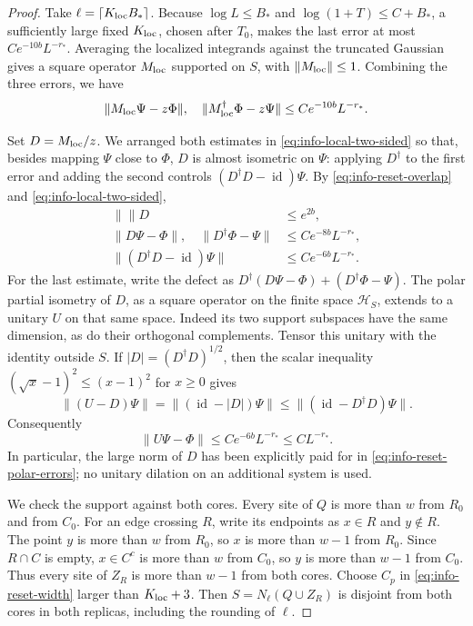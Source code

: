 \documentclass[11pt]{article}
\numberwithin{equation}{section}
\theoremstyle{definition}
\theoremstyle{remark}
\begin{document}
\begin{proof}
Take $\ell=\lceil K_{\rm loc}B_*\rceil$.  Because
$\log L\le B_*$ and $\log(1+T)\le C+B_*$, a sufficiently large fixed
$K_{\rm loc}$, chosen after $T_0$, makes the last error at most
$Ce^{-10b}L^{-r_*}$.  Averaging the localized integrands against the
truncated Gaussian gives a square operator $M_{\rm loc}$ supported on
$S$, with $\lVert M_{\rm loc}\rVert\le1$.  Combining the three errors, we
have
\begin{equation}
 \lVert M_{\rm loc}\Psi-z\Phi\rVert,\quad
 \lVert M_{\rm loc}^\dagger\Phi-z\Psi\rVert
      \le C e^{-10b}L^{-r_*}.
 \label{eq:info-local-two-sided}
\end{equation}

Set $D=M_{\rm loc}/z$.  We arranged both estimates in
\eqref{eq:info-local-two-sided} so that, besides mapping $\Psi$ close
to $\Phi$, $D$ is almost isometric on $\Psi$: applying $D^\dagger$
to the first error and adding the second controls
$(D^\dagger D-\operatorname{id})\Psi$.  By
\eqref{eq:info-reset-overlap} and \eqref{eq:info-local-two-sided},
\begin{align}
 \lVert \rVert D&\le e^{2b},\\
 \lVert D\Psi-\Phi\rVert,\quad\lVert D^\dagger\Phi-\Psi\rVert
      &\le C e^{-8b}L^{-r_*},\\
 \lVert (D^\dagger D-\operatorname{id})\Psi\rVert
      &\le C e^{-6b}L^{-r_*}.
 \label{eq:info-reset-polar-errors}
\end{align}
For the last estimate, write the defect as
$D^\dagger(D\Psi-\Phi)+(D^\dagger\Phi-\Psi)$.
The polar partial isometry of $D$, as a square operator on the finite
space $\mathcal H_S$, extends to a unitary $U$ on that same space.
Indeed its two support subspaces have the same dimension, as do their
orthogonal complements.  Tensor this unitary with the identity outside
$S$.  If $|D|=(D^\dagger D)^{1/2}$, then the scalar inequality
$(\sqrt{x}-1)^2\le(x-1)^2$ for $x\ge0$ gives
\[
 \lVert (U-D)\Psi\rVert=\lVert (\operatorname{id}-|D|)\Psi\rVert
       \le\lVert (\operatorname{id}-D^\dagger D)\Psi\rVert.
\]
Consequently
\begin{equation}
 \lVert U\Psi-\Phi\rVert\le C e^{-6b}L^{-r_*}\le CL^{-r_*}.
 \label{eq:info-reset-unitary}
\end{equation}
In particular, the large norm of $D$ has been explicitly paid for in
\eqref{eq:info-reset-polar-errors}; no unitary dilation on an additional
system is used.

We check the support against both cores.  Every site of $Q$ is more
than $w$ from $R_0$ and from $C_0$.  For an edge crossing $R$, write its
endpoints as $x\in R$ and $y\notin R$.  The point $y$ is more than $w$
from $R_0$, so $x$ is more than $w-1$ from $R_0$.  Since $R\cap C$ is
empty, $x\in C^c$ is more than $w$ from $C_0$, so $y$ is more than
$w-1$ from $C_0$.  Thus every site of $Z_R$ is more than $w-1$ from
both cores.  Choose $C_p$ in \eqref{eq:info-reset-width} larger than
$K_{\rm loc}+3$.  Then $S=N_\ell(Q\cup Z_R)$ is disjoint from both cores in
both replicas, including the rounding of $\ell$.


\end{proof}
\end{document}

